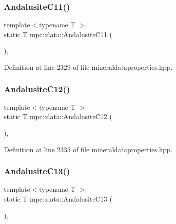 \subsubsection{\texorpdfstring{Andalusite\+C11()}{AndalusiteC11()}}
{\footnotesize\ttfamily template$<$typename T $>$ \\
static T mpc\+::data\+::\+Andalusite\+C11 (\begin{DoxyParamCaption}{ }\end{DoxyParamCaption})\hspace{0.3cm}{\ttfamily [inline]}, {\ttfamily [static]}}



Definition at line 2329 of file mineraldataproperties.\+hpp.

\mbox{\label{namespacempc_1_1data_a22e3b6a9e66a84309e51fcda1f468557}} 
\subsubsection{\texorpdfstring{Andalusite\+C12()}{AndalusiteC12()}}
{\footnotesize\ttfamily template$<$typename T $>$ \\
static T mpc\+::data\+::\+Andalusite\+C12 (\begin{DoxyParamCaption}{ }\end{DoxyParamCaption})\hspace{0.3cm}{\ttfamily [inline]}, {\ttfamily [static]}}



Definition at line 2335 of file mineraldataproperties.\+hpp.

\mbox{\label{namespacempc_1_1data_a160d4c7a42d3b200e7d39fdc62a1534e}} 
\subsubsection{\texorpdfstring{Andalusite\+C13()}{AndalusiteC13()}}
{\footnotesize\ttfamily template$<$typename T $>$ \\
static T mpc\+::data\+::\+Andalusite\+C13 (\begin{DoxyParamCaption}{ }\end{DoxyParamCaption})\hspace{0.3cm}{\ttfamily [inline]}, {\ttfamily [static]}}



